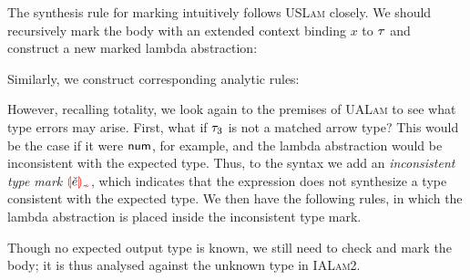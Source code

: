 The synthesis rule for marking intuitively follows \textsc{USLam} closely. We should recursively
mark the body with an extended context binding $x$ to $\TMV$ and construct a new marked lambda
abstraction:
%
\begin{mathpar}

\end{mathpar}
%
Similarly, we construct corresponding analytic rules:
%
\begin{mathpar}

\end{mathpar}
%
However, recalling totality, we look again to the premises of \textsc{UALam} to see what type errors
may arise. First, what if $\TMV_3$ is not a matched arrow type? This would be the case if it were
$\TNum$, for example, and the lambda abstraction would be inconsistent with the expected type. Thus,
to the syntax we add an \emph{inconsistent type mark} $\ECInconType{\ECMV}$, which indicates that
the expression does not synthesize a type consistent with the expected type. We then have the
following rules, in which the lambda abstraction is placed inside the inconsistent type mark.
%
\begin{mathpar}

\end{mathpar}
%
Though no expected output type is known, we still need to check and mark the body; it is thus
analysed against the unknown type in \textsc{IALam2}.

